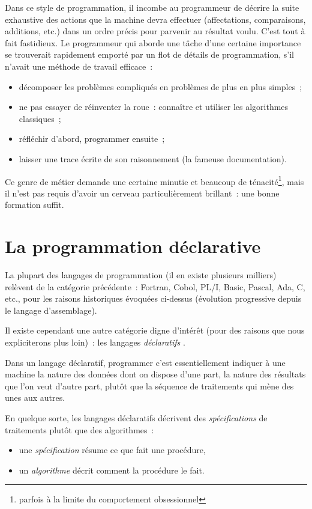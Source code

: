 Dans ce style de programmation, il incombe au programmeur de décrire
la suite exhaustive des actions que la machine devra effectuer
(affectations, comparaisons, additions, etc.) dans un ordre précis
pour parvenir au résultat voulu. C'est tout à fait fastidieux. Le
programmeur qui aborde une tâche d'une certaine importance se
trouverait rapidement emporté par un flot de détails de programmation,
s'il n'avait une méthode de travail efficace~:

\begin{itemize}
	\item décomposer les problèmes compliqués en problèmes de plus
	en plus simples~; 
\item ne pas essayer de réinventer la roue~:
	connaître et utiliser les algorithmes classiques~; 
\item	réfléchir d'abord, programmer ensuite~;
\item laisser une
	trace écrite de son raisonnement (la fameuse documentation).
\end{itemize}

Ce genre de métier demande une certaine minutie et beaucoup de
ténacité\footnote{parfois à la limite du comportement obsessionnel}, mais il
n'est pas requis d'avoir un cerveau particulièrement brillant~: une
bonne formation suffit.


\section{La programmation déclarative}

La plupart des langages de programmation (il en existe plusieurs
milliers) relèvent de la catégorie précédente~: Fortran, Cobol, PL/I,
Basic, Pascal, Ada, C, etc., pour les raisons historiques évoquées
ci-dessus (évolution progressive depuis le langage d'assemblage).

Il existe cependant une autre catégorie digne d'intérêt (pour des
raisons que nous expliciterons plus loin)~: les langages {\em
déclaratifs}
.

Dans un langage déclaratif, programmer c'est essentiellement indiquer
 à une machine la nature des données dont on dispose d'une part, la
 nature des résultats que l'on veut d'autre part, plutôt que la
 séquence de traitements qui mène des unes aux autres.

En quelque sorte, les langages déclaratifs décrivent des
\emph{spécifications} de traitements plutôt que des algorithmes~:
\begin{itemize}
\item  une \emph{spécification}  résume ce que fait une procédure,  
\item un \emph{algorithme} décrit comment la procédure le fait. 
\end{itemize}

